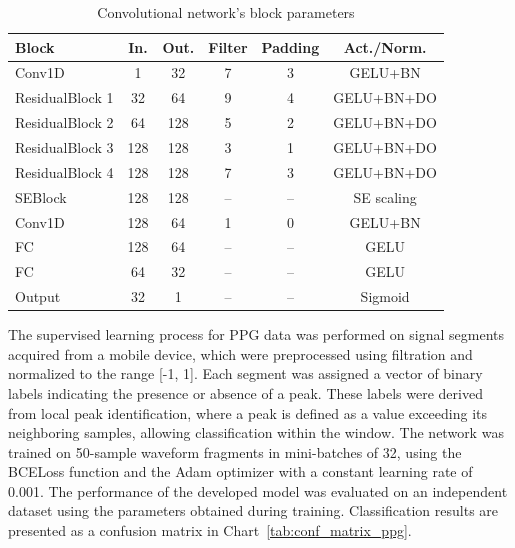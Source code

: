 \documentclass{citask}
\begin{document}
\begin{table}[ht]
\centering
\caption{Convolutional network's block parameters}
\label{tab:ppg_layers}
\begin{tabular}{|l|c|c|c|c|c|}
\hline
\textbf{Block} & \textbf{In.} & \textbf{Out.} & \textbf{Filter} & \textbf{Padding} & \textbf{Act./Norm.} \\
\hline
Conv1D & 1 & 32 & 7 & 3 & GELU+BN \\
ResidualBlock 1 & 32 & 64 & 9 & 4 & GELU+BN+DO \\
ResidualBlock 2 & 64 & 128 & 5 & 2 & GELU+BN+DO \\
ResidualBlock 3 & 128 & 128 & 3 & 1 & GELU+BN+DO\\
ResidualBlock 4 & 128 & 128 & 7 & 3 & GELU+BN+DO \\
SEBlock & 128 & 128 & – & – & SE scaling \\
Conv1D  & 128 & 64 & 1 & 0 & GELU+BN \\
FC & 128 & 64 & – & – & GELU \\
FC & 64 & 32 & – & – & GELU \\
Output & 32 & 1 & – & – & Sigmoid \\
\hline
\end{tabular}
\end{table}

The supervised learning process for PPG data was performed on signal segments acquired from a mobile device, which were preprocessed using filtration and normalized to the range [-1, 1]. Each segment was assigned a vector of binary labels indicating the presence or absence of a peak. These labels were derived from local peak identification, where a peak is defined as a value exceeding its neighboring samples, allowing classification within the window. The network was trained on 50-sample waveform fragments in mini-batches of 32, using the BCELoss function and the Adam optimizer with a constant learning rate of 0.001. The performance of the developed model was evaluated on an independent dataset using the parameters obtained during training. Classification results are presented as a confusion matrix in Chart~\ref{tab:conf_matrix_ppg}.
\end{document}
